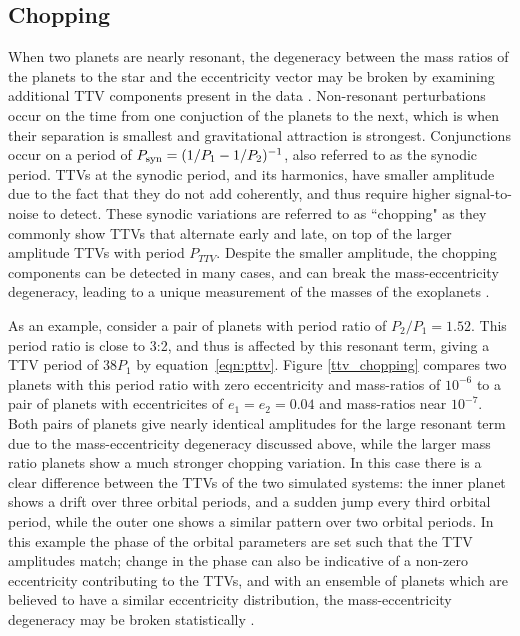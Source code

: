 \documentclass[graybox,natbib,nosecnum]{svmult}
\begin{document}
\subsection{Chopping}

When two planets are nearly resonant, the degeneracy between the mass ratios of the planets to the star
and the eccentricity vector may be broken by examining additional TTV components present in the data \citep{2015ApJ...802..116D}.
Non-resonant perturbations occur on the time from one conjuction of the planets to the next, which is
when their separation is smallest and gravitational attraction is strongest.  Conjunctions
occur on a period of $P_{\rm syn}= (1/P_1-1/P_2)^{-1}$, also referred to as the synodic period.
TTVs at the synodic period, and its harmonics, have smaller amplitude due to 
the fact that they do not add coherently, and thus require higher signal-to-noise to detect.
These synodic variations are referred to as ``chopping" as they commonly
show TTVs that alternate early and late, on top of the larger amplitude TTVs with period $P_{TTV}$.
Despite the smaller amplitude, the chopping components can be detected in many cases, and can break
the mass-eccentricity degeneracy, leading to a unique measurement of the masses of the exoplanets 
\citep{2014ApJ...790...58N,2014ApJ...795..167S,2015ApJ...802..116D}.

As an example, consider a pair of planets with period ratio of $P_2/P_1 = 1.52$.  This period ratio
is close to 3:2, and thus is affected by this resonant term, giving a TTV period of $38 P_1$ by equation~\ref{eqn:pttv}.
Figure \ref{ttv_chopping} compares two planets with this period ratio with zero eccentricity
and mass-ratios of $10^{-6}$ to a pair of planets with eccentricites of $e_1=e_2=0.04$
and mass-ratios near $10^{-7}$.  Both pairs of planets give nearly identical amplitudes
for the large resonant term due to the mass-eccentricity degeneracy discussed above, while the larger mass ratio planets show a 
much stronger chopping variation.  In this case there is a clear difference between the TTVs of the two simulated
systems:  the inner planet shows a drift over three orbital periods, and a sudden jump
every third orbital period, while the outer one shows a similar pattern over two orbital
periods.  
In this example the phase of the orbital parameters are set such that the TTV amplitudes match;  change
in the phase can also be indicative of a non-zero eccentricity contributing to the TTVs,
and with an ensemble of planets which are believed to have a similar eccentricity
distribution, the mass-eccentricity degeneracy may be broken statistically \citep{2012ApJ...761..122L,
2014ApJ...787...80H}.
\end{document}
